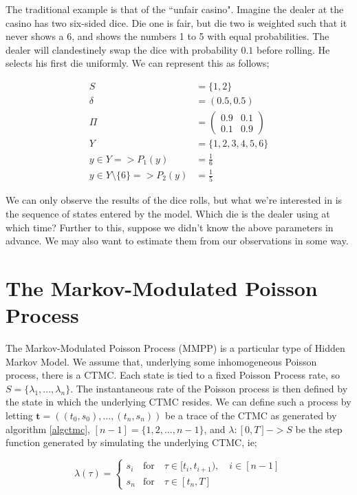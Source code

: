 The traditional example is that of the ``unfair casino". Imagine the dealer at the casino has two six-sided dice. Die one is fair, but die two is weighted such that it never shows a 6, and shows the numbers 1 to 5 with equal probabilities. The dealer will clandestinely swap the dice with probability $0.1$ before rolling. He selects his first die uniformly. We can represent this as follows;

\begin{align*}
S &= \{1,2\}\\
\delta &= (0.5,0.5)\\
\Pi &= 
\left(
	\begin{matrix}
	0.9 & 0.1 \\
	0.1 & 0.9
	\end{matrix}
\right)\\
Y &= \{1,2,3,4,5,6\}\\
y \in Y => P_1(y) &= \frac{1}{6}\\
y \in Y \setminus \{6\} => P_2(y) &= \frac{1}{5}
\end{align*}

We can only observe the results of the dice rolls, but what we're interested in is the sequence of states entered by the model. Which die is the dealer using at which time? Further to this, suppose we didn't know the above parameters in advance. We may also want to estimate them from our observations in some way.

\section{The Markov-Modulated Poisson Process}\label{mmppdef}

The Markov-Modulated Poisson Process (MMPP) is a particular type of Hidden Markov Model. We assume that, underlying some inhomogeneous Poisson process, there is a CTMC. Each state is tied to a fixed Poisson Process rate, so $S = \{\lambda_1,...,\lambda_n\}$. The instantaneous rate of the Poisson process is then defined by the state in which the underlying CTMC resides. We can define such a process by letting $\mathbf{t} = ((t_0,s_0),...,(t_n,s_n))$ be a trace of the CTMC as generated by algorithm \ref{algctmc}, $[n-1] = \{1,2,...,n-1\}$, and $\lambda : [0,T]->S$ be the step function generated by simulating the underlying CTMC, ie;

$$
\lambda(\tau) = 
\begin{cases}
	s_i & \mbox{for} \quad \tau \in [t_i,t_{i+1}), \quad i \in [n-1]\\
	s_n & \mbox{for} \quad \tau \in [t_n,T]
\end{cases}
$$

